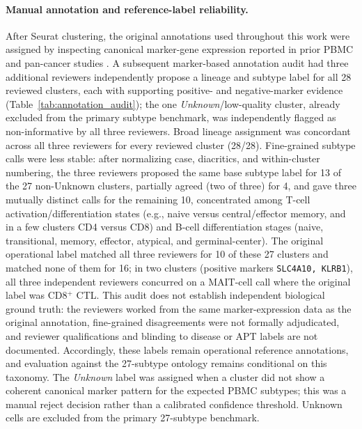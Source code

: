 \paragraph{Manual annotation and reference-label reliability.}
After Seurat clustering, the original annotations used throughout this work were
assigned by inspecting canonical marker-gene expression reported in prior PBMC
and pan-cancer studies \citep{zhang2024pan,yang2024pan}. A subsequent
marker-based annotation audit had three additional reviewers independently
propose a lineage and subtype label for all 28 reviewed clusters, each with
supporting positive- and negative-marker evidence
(Table~\ref{tab:annotation_audit}); the one \emph{Unknown}/low-quality cluster,
already excluded from the primary subtype benchmark, was independently flagged
as non-informative by all three reviewers. Broad lineage assignment was
concordant across all three reviewers for every reviewed cluster (28/28).
Fine-grained subtype calls were less stable: after normalizing case, diacritics,
and within-cluster numbering, the three reviewers proposed the same base subtype
label for 13 of the 27 non-Unknown clusters, partially agreed (two of three) for
4, and gave three mutually distinct calls for the remaining 10, concentrated
among T-cell activation/differentiation states (e.g., naive versus
central/effector memory, and in a few clusters CD4 versus CD8) and B-cell
differentiation stages (naive, transitional, memory, effector, atypical, and
germinal-center). The original operational label matched all three reviewers for
10 of these 27 clusters and matched none of them for 16; in two clusters
(positive markers \texttt{SLC4A10, KLRB1}), all three independent reviewers
concurred on a MAIT-cell call where the original label was CD8$^+$ CTL. This
audit does not establish independent biological ground truth: the reviewers
worked from the same marker-expression data as the original annotation, fine-grained
disagreements were not formally adjudicated, and reviewer qualifications and
blinding to disease or APT labels are not documented. Accordingly, these labels
remain operational reference annotations, and evaluation against the
27-subtype ontology remains conditional on this taxonomy. The \emph{Unknown}
label was assigned when a cluster did not show a coherent canonical marker
pattern for the expected PBMC subtypes; this was a manual reject decision rather
than a calibrated confidence threshold. Unknown cells are excluded from the
primary 27-subtype benchmark.


